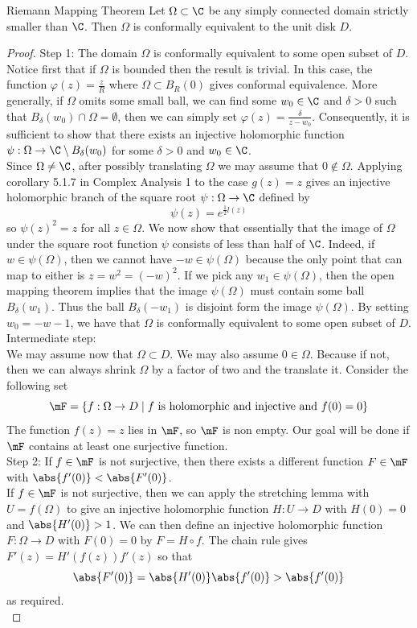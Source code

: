 \documentclass[a4paper]{article}
\begin{document}
\begin{thm}{Riemann Mapping Theorem}{} Let $\Omega\subset\C$ be any simply connected domain strictly smaller than $\C$. Then $\Omega$ is conformally equivalent to the unit disk $D$. 
\begin{proof}
Step 1: The domain $\Omega$ is conformally equivalent to some open subset of $D$. \\
Notice first that if $\Omega$ is bounded then the result is trivial. In this case, the function $\varphi(z)=\frac{z}{R}$ where $\Omega\subset B_R(0)$ gives conformal equivalence. More generally, if $\Omega$ omits some small ball, we can find some $w_0\in\C$ and $\delta>0$ such that $B_\delta(w_0)\cap\Omega=\emptyset$, then we can simply set $\varphi(z)=\frac{\delta}{z-w_0}$. Consequently, it is sufficient to show that there exists an injective holomorphic function $\psi:\Omega\to\C\setminus B_\delta(w_0)$ for some $\delta>0$ and $w_0\in\C$. \\

Since $\Omega\neq\C$, after possibly translating $\Omega$ we may assume that $0\notin\Omega$. Applying corollary 5.1.7 in Complex Analysis 1 to the case $g(z)=z$ gives an injective holomorphic branch of the square root $\psi:\Omega\to\C$ defined by $$\psi(z)=e^{\frac{1}{2}l(z)}$$ so $\psi(z)^2=z$ for all $z\in\Omega$. We now show that essentially that the image of $\Omega$ under the square root function $\psi$ consists of less than half of $\C$. Indeed, if $w\in\psi(\Omega)$, then we cannot have $-w\in\psi(\Omega)$ because the only point that can map to either is $z=w^2=(-w)^2$. If we pick any $w_1\in\psi(\Omega)$, then the open mapping theorem implies that the image $\psi(\Omega)$ must contain some ball $B_\delta(w_1)$. Thus the ball $B_\delta(-w_1)$ is disjoint form the image $\psi(\Omega)$. By setting $w_0=-w-1$, we have that $\Omega$ is conformally equivalent to some open subset of $D$. \\

Intermediate step: \\
We may assume now that $\Omega\subset D$. We may also assume $0\in\Omega$. Because if not, then we can always shrink $\Omega$ by a factor of two and the translate it. Consider the following set $$\mF=\{f:\Omega\to D\;|\;f\text{ is holomorphic and injective and }f(0)=0\}$$ The function $f(z)=z$ lies in $\mF$, so $\mF$ is non empty. Our goal will be done if $\mF$ contains at least one surjective function. \\

Step 2: If $f\in\mF$ is not surjective, then there exists a different function $F\in\mF$ with $\abs{f'(0)}<\abs{F'(0)}$. \\
If $f\in\mF$ is not surjective, then we can apply the stretching lemma with $U=f(\Omega)$ to give an injective holomorphic function $H:U\to D$ with $H(0)=0$ and $\abs{H'(0)}>1$. We can then define an injective holomorphic function $F:\Omega\to D$ with $F(0)=0$ by $F=H\circ f$. The chain rule gives $F'(z)=H'(f(z))f'(z)$ so that $$\abs{F'(0)}=\abs{H'(0)}\abs{f'(0)}>\abs{f'(0)}$$ as required. \\


\end{proof}
\end{thm}
\end{document}
